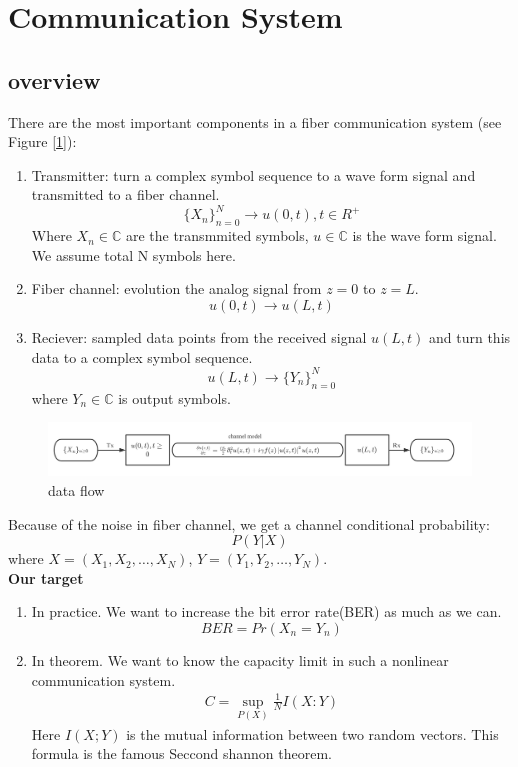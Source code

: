 \section{Communication System}
\subsection{overview}
There are the most important components in  a fiber communication system (see Figure [\ref{flow-chart}]): 
\begin{enumerate}
\item Transmitter: turn a complex symbol sequence to a wave form signal and transmitted to a fiber channel.
$$
\{X_n\}_{n=0}^{N} \rightarrow u(0,t), t\in R^{+}
$$
Where $X_n\in \mathbb{C}$ are the transmmited symbols, $u \in \mathbb{C}$ is the wave form signal. We assume total N symbols here.
\item Fiber channel: evolution the analog signal from $z=0$ to $z=L$.
$$
 u(0,t) \rightarrow u(L,t)
$$
\item Reciever: sampled data points from the received signal $u(L,t)$ and turn this data to a complex symbol sequence. 
$$
u(L,t) \rightarrow \{Y_n\}_{n=0}^{N}
$$ 
where $Y_n \in \mathbb{C}$ is output symbols.
\end{enumerate}
\begin{figure}[ht]
\centering
\includegraphics[width=\linewidth]{img/flow-chart.png}
\caption{data flow}
\label{flow-chart}
\end{figure}
Because of the noise in fiber channel, we get a channel conditional probability:
$$
P(Y|X)
$$
where $X = (X_1,X_2,\ldots,X_N)$, $Y=(Y_1,Y_2,\ldots,Y_N)$.\\
\textbf{Our target}
\begin{enumerate}
\item In practice. We want to increase the bit error rate(BER) as much as we can.
$$
BER = Pr(X_n=Y_n)
$$
\item In theorem. We want to know the capacity limit in such a nonlinear communication system.
\begin{align*}
C = \sup\limits_{P(X)} \frac{1}{N}I(X:Y)
\end{align*}
Here $I(X;Y)$ is the mutual information between two random vectors. This formula is the famous Seccond shannon theorem.
\end{enumerate}


